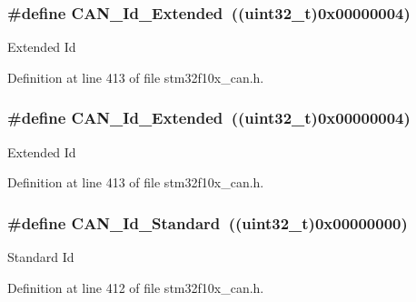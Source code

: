 \subsubsection[{\texorpdfstring{C\+A\+N\+\_\+\+Id\+\_\+\+Extended}{CAN_Id_Extended}}]{\setlength{\rightskip}{0pt plus 5cm}\#define C\+A\+N\+\_\+\+Id\+\_\+\+Extended~(({\bf uint32\+\_\+t})0x00000004)}\hypertarget{group___c_a_n__identifier__type_gaf6c5c0b43b968fed17fd90246912b1a7}{}\label{group___c_a_n__identifier__type_gaf6c5c0b43b968fed17fd90246912b1a7}
Extended Id 

Definition at line 413 of file stm32f10x\+\_\+can.\+h.

\subsubsection[{\texorpdfstring{C\+A\+N\+\_\+\+Id\+\_\+\+Extended}{CAN_Id_Extended}}]{\setlength{\rightskip}{0pt plus 5cm}\#define C\+A\+N\+\_\+\+Id\+\_\+\+Extended~(({\bf uint32\+\_\+t})0x00000004)}\hypertarget{group___c_a_n__identifier__type_gaf6c5c0b43b968fed17fd90246912b1a7}{}\label{group___c_a_n__identifier__type_gaf6c5c0b43b968fed17fd90246912b1a7}
Extended Id 

Definition at line 413 of file stm32f10x\+\_\+can.\+h.

\subsubsection[{\texorpdfstring{C\+A\+N\+\_\+\+Id\+\_\+\+Standard}{CAN_Id_Standard}}]{\setlength{\rightskip}{0pt plus 5cm}\#define C\+A\+N\+\_\+\+Id\+\_\+\+Standard~(({\bf uint32\+\_\+t})0x00000000)}\hypertarget{group___c_a_n__identifier__type_ga151d9df8a6f361d0a3231593726b5a13}{}\label{group___c_a_n__identifier__type_ga151d9df8a6f361d0a3231593726b5a13}
Standard Id 

Definition at line 412 of file stm32f10x\+\_\+can.\+h.

